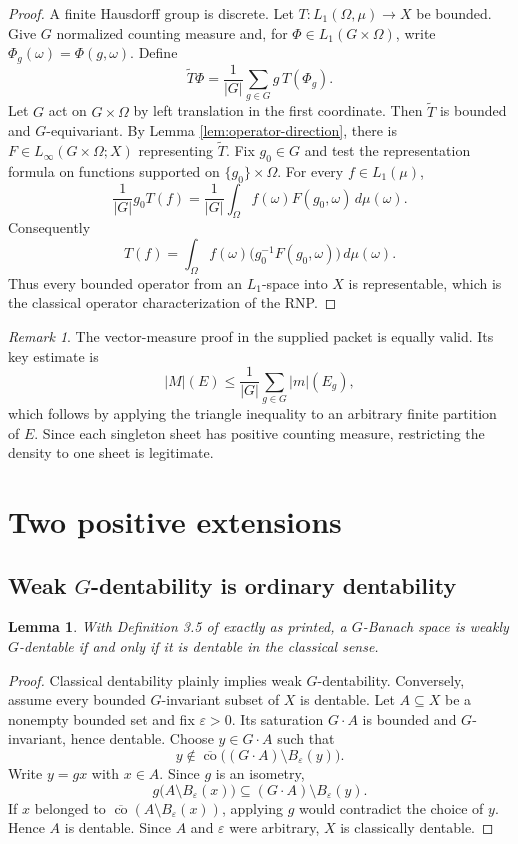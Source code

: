 \documentclass[11pt]{article}
\newtheorem{lemma}[theorem]{Lemma}
\theoremstyle{remark}
\newtheorem{remark}[theorem]{Remark}
\newcommand{\co}{\operatorname{co}}
\begin{document}
\begin{proof}
A finite Hausdorff group is discrete.  Let
$T:L_1(\Omega,\mu)\to X$ be bounded.  Give $G$ normalized counting measure
and, for $\Phi\in L_1(G\times\Omega)$, write
$\Phi_g(\omega)=\Phi(g,\omega)$.  Define
\[
  \widetilde T\Phi
  =\frac1{|G|}\sum_{g\in G}g\,T(\Phi_g).
\]
Let $G$ act on $G\times\Omega$ by left translation in the first coordinate.
Then $\widetilde T$ is bounded and $G$-equivariant.  By Lemma
\ref{lem:operator-direction}, there is
$F\in L_\infty(G\times\Omega;X)$ representing $\widetilde T$.
Fix $g_0\in G$ and test the representation formula on functions supported on
$\{g_0\}\times\Omega$.  For every $f\in L_1(\mu)$,
\[
  \frac1{|G|}g_0T(f)
  =\frac1{|G|}\int_\Omega f(\omega)F(g_0,\omega)\,d\mu(\omega).
\]
Consequently
\[
  T(f)=\int_\Omega f(\omega)
  \bigl(g_0^{-1}F(g_0,\omega)\bigr)\,d\mu(\omega).
\]
Thus every bounded operator from an $L_1$-space into $X$ is representable,
which is the classical operator characterization of the RNP.
\end{proof}

\begin{remark}
The vector-measure proof in the supplied packet is equally valid.  Its key
estimate is
\[
 |M|(E)\leq \frac1{|G|}\sum_{g\in G}|m|(E_g),
\]
which follows by applying the triangle inequality to an arbitrary finite
partition of $E$.  Since each singleton sheet has positive counting measure,
restricting the density to one sheet is legitimate.
\end{remark}

\section{Two positive extensions}

\subsection{Weak $G$-dentability is ordinary dentability}

\begin{lemma}\label{lem:weak-collapse}
With Definition 3.5 of \cite{DDJR} exactly as printed, a $G$-Banach space is
weakly $G$-dentable if and only if it is dentable in the classical sense.
\end{lemma}

\begin{proof}
Classical dentability plainly implies weak $G$-dentability.  Conversely,
assume every bounded $G$-invariant subset of $X$ is dentable.  Let
$A\subseteq X$ be a nonempty bounded set and fix $\varepsilon>0$.  Its
saturation $G\cdot A$ is bounded and $G$-invariant, hence dentable.  Choose
$y\in G\cdot A$ such that
\[
 y\notin \overline{\co}\bigl((G\cdot A)\setminus
 B_\varepsilon(y)\bigr).
\]
Write $y=gx$ with $x\in A$.  Since $g$ is an isometry,
\[
 g\bigl(A\setminus B_\varepsilon(x)\bigr)
 \subseteq (G\cdot A)\setminus B_\varepsilon(y).
\]
If $x$ belonged to
$\overline{\co}(A\setminus B_\varepsilon(x))$, applying $g$ would
contradict the choice of $y$.  Hence $A$ is dentable.  Since $A$ and
$\varepsilon$ were arbitrary, $X$ is classically dentable.
\end{proof}
\end{document}

